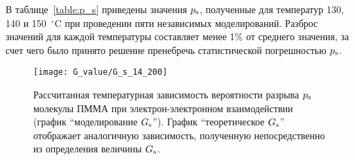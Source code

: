 В таблице~\ref{table:p_s} приведены значения $p_\mathrm{s}$, полученные для температур 130, 140 и 150~$^\circ$C при проведении пяти независимых моделирований. Разброс значений для каждой температуры составляет менее 1\% от среднего значения, за счет чего было принято решение пренебречь статистической погрешностью $p_\mathrm{s}$.

\begin{figure}
	\centering
	\texttt{[image: G\_value/G\_s\_14\_200]}
	\caption{Рассчитанная температурная зависимость вероятности разрыва $p_\mathrm{s}$ молекулы ПММА при электрон-электронном взаимодействии (график ``моделирование $G_\mathrm{s}$''). График ``теоретическое $G_\mathrm{s}$'' отображает аналогичную зависимость, полученную непосредственно из определения величины $G_\mathrm{s}$.\vspace{1.5em}}
	\label{fig:P_s}
\end{figure}


